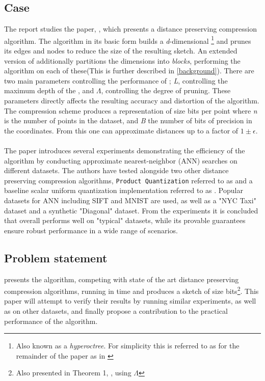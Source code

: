 \subsection{Case} %
The report studies the paper, \cite{wagner17}, which presents a distance preserving compression algorithm. The algorithm in its basic form builds a \textit{d}-dimensional \qt{}\footnote{Also known as a \textit{hyperoctree}. For simplicity this is referred to as \qt{} for the remainder of the paper as in \cite{wagner17}} and prunes its edges and nodes to reduce the size of the resulting sketch. An extended version of \qs{} additionally partitions the dimensions into \textit{blocks}, performing the algorithm on each of these(This is further described in \ref{background}). There are two main parameters controlling the performance of \qs{}; \textit{L}, controlling the maximum depth of the \qt{}, and $\Lambda$, controlling the degree of pruning. These parameters directly affects the resulting accuracy and distortion of the algorithm. The compression scheme produces a representation of size  bits per point where \textit{n} is the number of points in the dataset, and \textit{B} the number of bits of precision in the coordinates. From this one can approximate distances up to a factor of $1\pm\epsilon$. 
\\
\\
The paper introduces several experiments demonstrating the efficiency of the algorithm by conducting approximate nearest-neighbor (ANN) searches on different datasets. The authors have tested \qs{} alongside two other distance preserving compression algorithms, \texttt{Product Quantization} referred to as \pq{} and a baseline scalar uniform quantization implementation referred to as \gr{}. Popular datasets for ANN including SIFT and MNIST are used, as well as a "NYC Taxi" dataset and a synthetic "Diagonal" dataset. From the experiments it is concluded that \qs{} overall performs well on "typical" datasets, while its provable guarantees ensure robust performance in a wide range of scenarios\cite[p. 2, l. 38-40]{wagner17}. 

\subsection{Problem statement} %
\label{intro:problemStatement}
\cite{wagner17} presents the \qs{} algorithm, competing with state of the art distance preserving compression algorithms, running in  time and produces a sketch of size  bits\footnote{Also presented in Theorem 1, \cite[p. 3]{wagner17}, using $\Lambda$}. This paper will attempt to verify their results by running similar experiments, as well as on other datasets, and finally propose a contribution to the practical performance of the \qs{} algorithm.




